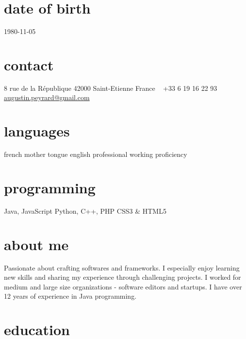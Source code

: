 \documentclass[]{k-cv} %
\begin{document}


\begin{aside} %
\section{date of birth}
\color{gray}1980-11-05
\section{contact}
8 rue de la R\'{e}publique
42000 Saint-Etienne
France
~
+33 6 19 16 22 93
~
\href{mailto:augustin.peyrard@gmail.com}{augustin.peyrard@gmail.com}
\section{languages}
french mother tongue
english professional working proficiency
\section{programming}
Java, JavaScript
Python, C++, PHP
CSS3 \& HTML5
\end{aside}


\section{about me}
{Passionate about crafting softwares and frameworks.
I especially enjoy learning new skills and sharing my experience through challenging projects.
I worked for medium and large size organizations - software editors and startups.
I have over 12 years of experience in Java programming.}


\section{education}
\end{document}
